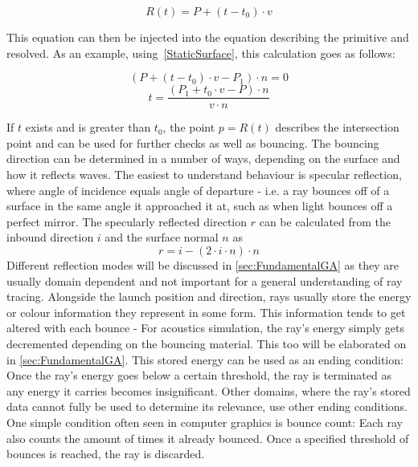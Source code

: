 \begin{equation}\label{RayEq}
    R(t) = P + (t - t_0) \cdot v
\end{equation}

This equation can then be injected into the equation describing the primitive and resolved.
As an example, using~\eqref{StaticSurface}, this calculation goes as follows:

\begin{equation*}
    (P + (t - t_0) \cdot v - P_1) \cdot n = 0
\end{equation*}
\begin{equation}\label{StaticSurfaceIntersect}
    t = \frac{(P_1 + t_0 \cdot v - P) \cdot n}{v \cdot n}
\end{equation}

If \(t\) exists and is greater than \(t_0\),
the point \(p = R(t)\) describes the intersection point and can be used for further checks
as well as bouncing.
\newline
The bouncing direction can be determined in a number of ways,
depending on the surface and how it reflects waves.
The easiest to understand behaviour is specular reflection,
where angle of incidence equals angle of departure -
i.e. a ray bounces off of a surface in the same angle it approached it at,
such as when light bounces off a perfect mirror.
The specularly reflected direction \(r\) can be calculated from the inbound direction \(i\) and the surface normal \(n\) as
\begin{equation}\label{eq:SpecularReflection}
    r = i - (2 \cdot i \cdot n) \cdot n
\end{equation}
Different reflection modes will be discussed in \autoref{sec:FundamentalGA} as they are usually domain dependent
and not important for a general understanding of ray tracing.
\newline
Alongside the launch position and direction,
rays usually store the energy or colour information they represent in some form.
This information tends to get altered with each bounce -
For acoustics simulation, the ray's energy simply gets decremented depending on the bouncing material.
This too will be elaborated on in \autoref{sec:FundamentalGA}.
\newline
This stored energy can be used as an ending condition:
Once the ray's energy goes below a certain threshold,
the ray is terminated as any energy it carries becomes insignificant.
Other domains, where the ray's stored data cannot fully be used to determine its relevance,
use other ending conditions.
One simple condition often seen in computer graphics is bounce count:
Each ray also counts the amount of times it already bounced.
Once a specified threshold of bounces is reached, the ray is discarded.

